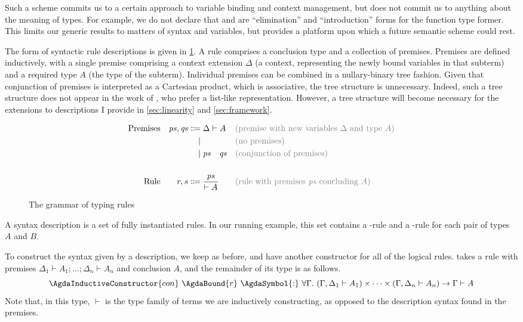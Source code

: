 Such a scheme commits us to a certain approach to variable binding and context
management, but does not commit us to anything about the meaning of types.
For example, we do not declare that  and  are
``elimination'' and ``introduction'' forms for the function type former.
This limits our generic results to matters of syntax and variables, but provides
a platform upon which a future semantic scheme could rest.

The form of syntactic rule descriptions is given in \cref{fig:simple-syntax}.
A rule comprises a conclusion type and a collection of premises.
Premises are defined inductively, with a single premise comprising a context
extension $\Delta$ (a context, representing the newly bound variables in that
subterm) and a required type $A$ (the type of the subterm).
Individual premises can be combined in a nullary-binary tree fashion.
Given that conjunction of premises is interpreted as a Cartesian product, which
is associative, the tree structure is unnecessary.
Indeed, such a tree structure does not appear in the work of \citet{AACMM21},
who prefer a list-like representation.
However, a tree structure will become necessary for the extensions to
descriptions I provide in \cref{sec:linearity} and \cref{sec:framework}.

\begin{figure}
  \begin{align*}
    \text{Premises} && \mathit{ps}, \mathit{qs} \Coloneqq{}& \Delta \vdash A
    &&\text{\color{gray}(premise with new variables $\Delta$ and type $A$)} \\
                    &&\mid{}&
    &&\text{\color{gray}(no premises)} \\
                    &&\mid{}& \mathit{ps} \quad \mathit{qs}
    &&\text{\color{gray}(conjunction of premises)} \\
    \\
    \text{Rule} && r, s \Coloneqq{}& {\mathit{ps} \over \vdash A}
    &&\text{\color{gray}(rule with premises $\mathit{ps}$ concluding $A$)}
  \end{align*}
  \caption{The grammar of typing rules}
  \label{fig:simple-syntax}
\end{figure}

A syntax description is a set of fully instantiated rules.
In our running example, this set contains a -rule and a
-rule for each pair of types $A$ and $B$.

To construct the syntax given by a description, we keep
 as before, and have another constructor
 for all of the logical rules.
 takes a rule  with premises
$\Delta_1 \vdash A_1; \ldots; \Delta_n \vdash A_n$ and conclusion $A$, and the
remainder of its type is as follows.
\[
  \AgdaInductiveConstructor{con}~\AgdaBound{r}~\AgdaSymbol{:}~%
  \forall\Gamma.~(\Gamma, \Delta_1 \vdash A_1) \times \cdots
  \times (\Gamma, \Delta_n \vdash A_n) \to \Gamma \vdash A
\]
Note that, in this type, $\vdash$ is the type family of terms we are
inductively constructing, as opposed to the description syntax found in the
premises.

